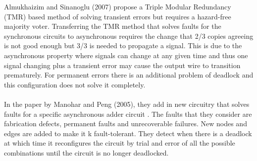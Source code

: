 \documentclass[12pt]{report}
\begin{document}
Almukhaizim and Sinanoglu (2007) propose a Triple Modular Redundancy (TMR) based method of solving transient errors but requires a hazard-free majority voter.  Transferring the TMR method that solves faults for the synchronous circuits to asynchronous requires the change that 2/3 copies agreeing is not good enough but 3/3 is needed to propagate a signal.  This is due to the asynchronous property where signals can change at any given time and thus one signal changing plus a transient error may cause the output wire to transition prematurely.  For permanent errors there is an additional problem of deadlock and this configuration does not solve it completely. \\
\\
In the paper by Manohar and Peng (2005), they add in new circuitry that solves faults for a specific asynchronous adder circuit \cite{PengManohar_asyncadder}.  The faults that they consider are fabrication defects, permanent faults and unrecoverable failures.  New nodes and edges are added to make it k fault-tolerant.  They detect when there is a deadlock at which time it reconfigures the circuit by trial and error of all the possible combinations until the circuit is no longer deadlocked.   \\
\end{document}
